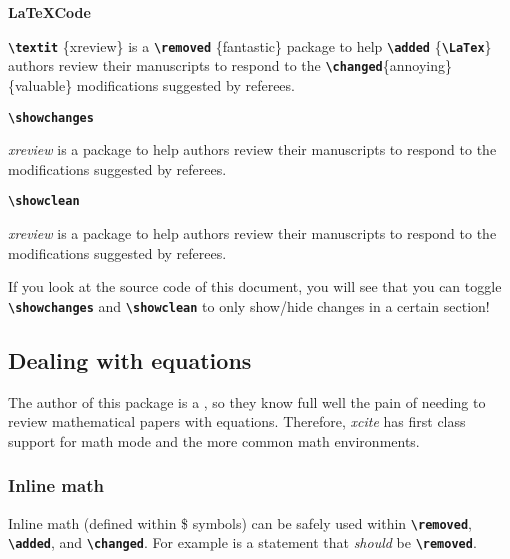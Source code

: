 \documentclass[a4paper]{ltxdoc}
\newcommand{\writecommand}[1]{\texttt{\textbf{{\textbackslash#1}}}}
\newcommand{\writearg}[1]{\{#1\}}
\begin{document}
\begin{center}
\begin{minipage}[t]{0.3\linewidth}
\textbf{\LaTeX Code}

\writecommand{textit} \writearg{xreview} is a \writecommand{removed} \writearg{fantastic} package to help \writecommand{added} \writearg{\writecommand{LaTex}} authors review their manuscripts to respond to the \writecommand{changed}\writearg{annoying} \writearg{valuable} modifications suggested by referees.

\end{minipage}
\hfill
\begin{minipage}[t]{0.3\linewidth}
\writecommand{showchanges}
\showchanges

\textit{xreview} is a  package to help \added{\LaTeX} authors review their manuscripts to respond to the  modifications suggested by referees.

\end{minipage}
\hfill
\begin{minipage}[t]{0.3\linewidth}   
\writecommand{showclean}
\showclean

\textit{xreview} is a  package to help \added{\LaTeX} authors review their manuscripts to respond to the  modifications suggested by referees.
\end{minipage}
\end{center}
\showchanges

If you look at the source code of this document, you will see that you can toggle \writecommand{showchanges} and \writecommand{showclean} to only show/hide changes in a certain section!

\subsection{Dealing with equations}

The author of this package is a , so they know full well the pain of needing to review mathematical papers with equations. 
Therefore, \textit{xcite} has first class support for math mode and the more common math environments. 

\subsubsection{Inline math}

Inline math (defined within \$ symbols) can be safely used within \writecommand{removed}, \writecommand{added}, and \writecommand{changed}. For example  is a statement that \textit{should} be \writecommand{removed}.
\end{document}
